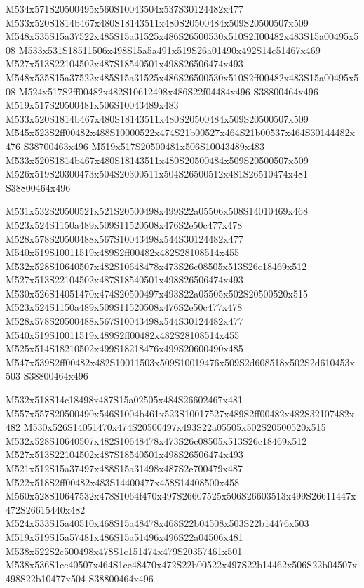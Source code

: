 \documentclass{article}
\begin{document}
\begin{multicols}{2}
M534x571S20500495x560S10043504x537S30124482x477 M533x520S1814b467x480S18143511x480S20500484x509S20500507x509 M548x535S15a37522x485S15a31525x486S26500530x510S2ff00482x483S15a00495x508 M533x531S18511506x498S15a5a491x519S26a01490x492S14c51467x469 M527x513S22104502x487S18540501x498S26506474x493 M548x535S15a37522x485S15a31525x486S26500530x510S2ff00482x483S15a00495x508 M524x517S2ff00482x482S10612498x486S22f04484x496 S38800464x496 M519x517S20500481x506S10043489x483 M533x520S1814b467x480S18143511x480S20500484x509S20500507x509 M545x523S2ff00482x488S10000522x474S21b00527x464S21b00537x464S30144482x476 S38700463x496 M519x517S20500481x506S10043489x483 M533x520S1814b467x480S18143511x480S20500484x509S20500507x509 M526x519S20300473x504S20300511x504S26500512x481S26510474x481 S38800464x496

M531x532S20500521x521S20500498x499S22a05506x508S14010469x468 M523x524S1150a489x509S11520508x476S2e50c477x478 M528x578S20500488x567S10043498x544S30124482x477 M540x519S10011519x489S2ff00482x482S28108514x455 M532x528S10640507x482S10648478x473S26c08505x513S26c18469x512 M527x513S22104502x487S18540501x498S26506474x493 M530x526S14051470x474S20500497x493S22a05505x502S20500520x515 M523x524S1150a489x509S11520508x476S2e50c477x478 M528x578S20500488x567S10043498x544S30124482x477 M540x519S10011519x489S2ff00482x482S28108514x455 M525x514S18210502x499S18218476x499S20600490x485 M547x539S2ff00482x482S10011503x509S10019476x509S2d608518x502S2d610453x503 S38800464x496

M532x518S14c18498x487S15a02505x484S26602467x481 M557x557S20500490x546S1004b461x523S10017527x489S2ff00482x482S32107482x482 M530x526S14051470x474S20500497x493S22a05505x502S20500520x515 M532x528S10640507x482S10648478x473S26c08505x513S26c18469x512 M527x513S22104502x487S18540501x498S26506474x493 M521x512S15a37497x488S15a31498x487S2e700479x487 M522x518S2ff00482x483S14400477x458S14408500x458 M560x528S10647532x478S1064f470x497S26607525x506S26603513x499S26611447x472S26615440x482 M524x533S15a40510x468S15a48478x468S22b04508x503S22b14476x503 M519x519S15a57481x486S15a51496x496S22a04506x481 M538x522S2c500498x478S1c151474x479S20357461x501 M538x536S1ce40507x464S1ce48470x472S22b00522x497S22b14462x506S22b04507x498S22b10477x504 S38800464x496


\end{multicols}
\end{document}
